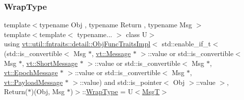 \subsubsection{\texorpdfstring{Wrap\+Type}{WrapType}}
{\footnotesize\ttfamily template$<$typename Obj , typename Return , typename Msg $>$ \\
template$<$template$<$ typename... $>$ class U$>$ \\
using \hyperlink{structvt_1_1util_1_1fntraits_1_1detail_1_1_obj_func_traits_impl}{vt\+::util\+::fntraits\+::detail\+::\+Obj\+Func\+Traits\+Impl}$<$ std\+::enable\+\_\+if\+\_\+t$<$(std\+::is\+\_\+convertible$<$ Msg $\ast$, \hyperlink{namespacevt_a3a3ddfef40b4c90915fa43cdd5f129ea}{vt\+::\+Message} $\ast$ $>$\+::value or std\+::is\+\_\+convertible$<$ Msg $\ast$, \hyperlink{namespacevt_a1125ac1da6c0bbf141e0ea0739d7602d}{vt\+::\+Short\+Message} $\ast$ $>$\+::value or std\+::is\+\_\+convertible$<$ Msg $\ast$, \hyperlink{namespacevt_ad67368ffae52d7325002586b41bb150e}{vt\+::\+Epoch\+Message} $\ast$ $>$\+::value or std\+::is\+\_\+convertible$<$ Msg $\ast$, \hyperlink{namespacevt_a89a92229c5622b855c02c549f83a1a68}{vt\+::\+Payload\+Message} $\ast$ $>$\+::value) and std\+::is\+\_\+pointer$<$ Obj $>$\+::value $>$, Return($\ast$)(Obj, Msg $\ast$)$>$\+::\hyperlink{structvt_1_1util_1_1fntraits_1_1detail_1_1_obj_func_traits_impl_3_01std_1_1enable__if__t_3_07std893b55e280057f64eb5acd3df924485e_af4aae584a92ed5ef3bc75aaa7431600e}{Wrap\+Type} =  U$<$\hyperlink{structvt_1_1util_1_1fntraits_1_1detail_1_1_obj_func_traits_impl_3_01std_1_1enable__if__t_3_07std893b55e280057f64eb5acd3df924485e_a07b53799e22d96567eb141e3eeafb094}{MsgT}$>$}



